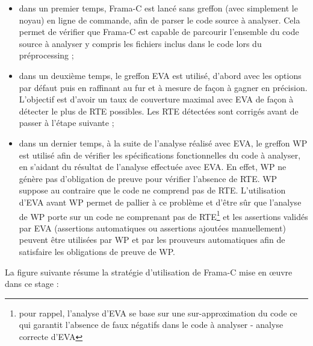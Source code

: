 \begin{itemize}
	\item dans un premier temps, Frama-C est lancé sans greffon (avec simplement le noyau) en ligne de commande, afin de parser le code source à analyser. Cela permet de vérifier que Frama-C est capable de parcourir l'ensemble du code source à analyser y compris les fichiers inclus dans le code lors du préprocessing ;
	\item dans un deuxième temps, le greffon EVA est utilisé, d'abord avec les options par défaut puis en raffinant au fur et à mesure de façon à gagner en précision. L'objectif est d'avoir un taux de couverture maximal avec EVA de façon à détecter le plus de RTE possibles. Les RTE détectées sont corrigés avant de passer à l'étape suivante ;
	\item dans un dernier temps, à la suite de l'analyse réalisé avec EVA, le greffon WP est utilisé afin de vérifier les spécifications fonctionnelles du code à analyser, en s'aidant du résultat de l'analyse effectuée avec EVA. En effet, WP ne génère pas d'obligation de preuve pour vérifier l'absence de RTE. WP suppose au contraire que le code ne comprend pas de RTE. L'utilisation d'EVA avant WP permet de pallier à ce problème et d'être sûr que l'analyse de WP porte sur un code ne comprenant pas de RTE\footnote{pour rappel, l'analyse d'EVA se base sur une sur-approximation du code ce qui garantit l'absence de faux négatifs dans le code à analyser - analyse correcte d'EVA} et les assertions validés par EVA (assertions automatiques ou assertions ajoutées manuellement) peuvent être utilisées par WP et par les prouveurs automatiques afin de satisfaire les obligations de preuve de WP.
\end{itemize}

La figure suivante résume la stratégie d'utilisation de Frama-C mise en œuvre dans ce stage :



